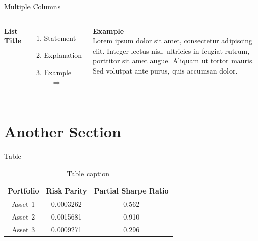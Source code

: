 \documentclass[aspectratio=169,xcolor=dvipsnames]{beamer}
\begin{document}
\begin{frame}{Multiple Columns}
    \begin{columns}[c] %

        \textbf{List Title}
        \begin{enumerate}
            \item Statement
            \pause
            \item Explanation
            \pause
            \item Example $\quad\Longrightarrow$
        \end{enumerate}

        \textbf{Example}\\
        Lorem ipsum dolor sit amet, consectetur adipiscing elit. Integer lectus nisl, ultricies in feugiat rutrum, porttitor sit amet augue. Aliquam ut tortor mauris. Sed volutpat ante purus, quis accumsan dolor.

    \end{columns}
\end{frame}

\section{Another Section}

\begin{frame}{Table}
    \begin{table}
        \begin{tabular}{c c c}
            \toprule
            \textbf{Portfolio} & \textbf{Risk Parity} & \textbf{Partial Sharpe Ratio} \\
            \midrule
            Asset 1         & 0.0003262           & 0.562               \\
            Asset 2         & 0.0015681           & 0.910               \\
            Asset 3         & 0.0009271           & 0.296               \\
            \bottomrule
        \end{tabular}
        \caption{Table caption}
    \end{table}
\end{frame}

\end{document}
